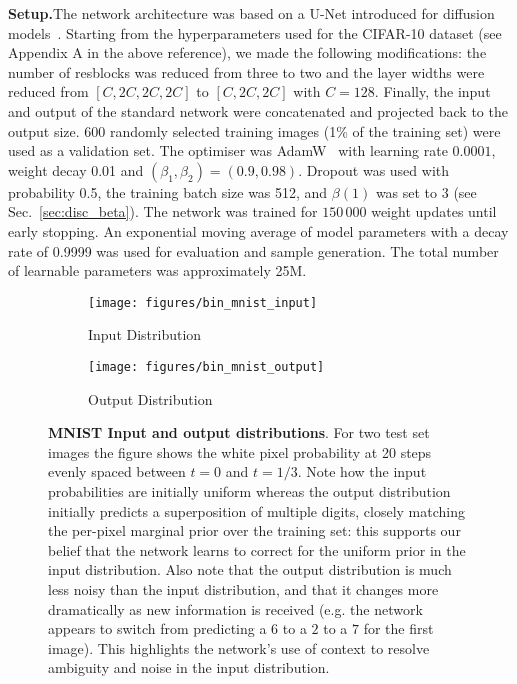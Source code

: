 \documentclass[11pt,table]{article}
\newcommand{\0}[1]{\constvec{0}{#1}}
\newcommand{\1}[1]{\constvec{1}{#1}}
\begin{document}
\noindent\textbf{Setup.}\quad The network architecture was based on a U-Net introduced for diffusion models~\citep{nichol2021improved}.
Starting from the hyperparameters used for the CIFAR-10 dataset (see Appendix A in the above reference), we made the following modifications: the number of resblocks was reduced from three to two and the layer widths were reduced from $[C,2C,2C,2C]$ to $[C,2C,2C]$ with $C=128$.
Finally, the input and output of the standard network were concatenated and projected back to the output size.
600 randomly selected training images (1\% of the training set) were used as a validation set.
The optimiser was AdamW~\citep{loshchilov2017decoupled} with learning rate $0.0001$, weight decay 0.01 and $(\beta_1,\beta_2) = (0.9,0.98)$.
Dropout was used with probability 0.5, the training batch size was 512, and $\beta(1)$ was set to $3$ (see Sec.~\ref{sec:disc_beta}).
The network was trained for $150\,000$ weight updates until early stopping.
An exponential moving average of model parameters with a decay rate of 0.9999 was used for evaluation and sample generation.
The total number of learnable parameters was approximately 25M.
\\

\begin{figure}[t!]
\centering
\begin{subfigure}{\textwidth}
    \centering
    \texttt{[image: figures/bin\_mnist\_input]}
    \caption{Input Distribution}
\end{subfigure}
\par\bigskip
\begin{subfigure}{\textwidth}
    \centering
    \texttt{[image: figures/bin\_mnist\_output]}
    \caption{Output Distribution}
\end{subfigure}

\caption{\textbf{MNIST Input and output distributions}. For two test set images the figure shows the white pixel probability at 20 steps evenly spaced between $t=0$ and $t=1/3$. Note how the input probabilities are initially uniform whereas the output distribution initially predicts a superposition of multiple digits, closely matching the per-pixel marginal prior over the training set: this supports our belief that the network learns to correct for the uniform prior in the input distribution. Also note that the output distribution is much less noisy than the input distribution, and that it changes more dramatically as new information is received (e.g. the network appears to switch from predicting a $6$ to a $2$ to a $7$ for the first image). This highlights the network's use of context to resolve ambiguity and noise in the input distribution.}
\end{figure}
\end{document}
